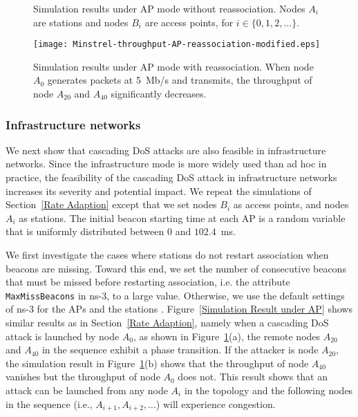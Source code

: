 \documentclass{IEEEtran}
\begin{document}
\begin{figure}[!t]
\centering
{}
\vfil
{}
\caption{Simulation results under AP mode without reassociation. Nodes $A_i$ are stations and
  nodes $B_i$ are access points, for $i \in \{0,1,2,\dots\}$.}
\label{Simulation Result under AP}
\end{figure}

\begin{figure}[!t]
\centering
\texttt{[image: Minstrel-throughput-AP-reassociation-modified.eps]}
\caption{Simulation results under AP mode with reassociation. When
  node $A_{0}$ generates packets at 5~Mb/s and transmits, the throughput of node $A_{20}$ and $A_{40}$ significantly decreases.}
\label{Simulation Result under AP mode with reassociation}
\end{figure}


\subsubsection{Infrastructure networks}
We next show that cascading DoS attacks are also feasible in
infrastructure networks. Since the infrastructure mode is more
widely used than ad hoc in practice, the feasibility of the cascading
DoS attack in infrastructure networks increases its severity and
potential impact. We repeat the simulations of Section~\ref{Rate
  Adaption} except that we set nodes $B_i$ as access points, and
nodes $A_i$ as stations. The initial beacon starting time at each AP is a random variable that is uniformly distributed between 0 and $102.4$~ms.

We first investigate the cases where stations do not restart association when beacons are missing.
Toward this end, we set the number of consecutive beacons that must be missed before restarting association, i.e. the attribute {\tt MaxMissBeacons} in ns-3, to a large value.
Otherwise, we use the default settings of ns-3 for the APs \cite{ns3ap} and the stations \cite{ns3sta}. Figure~\ref{Simulation Result under
AP} shows similar results as
in Section~\ref{Rate Adaption}, namely when a cascading DoS attack is launched by node $A_0$, as shown in Figure~\ref{Simulation Result under AP}(a),
the remote nodes $A_{20}$ and $A_{40}$ in the sequence exhibit a phase transition.
If the attacker is node $A_{20}$, the simulation result in Figure~\ref{Simulation Result under AP}(b) shows that the throughput of node
$A_{40}$ vanishes but the throughput of node $A_0$ does not. This result shows that an attack can be launched from any node $A_i$ in the topology
and the following nodes in the sequence (i.e., $A_{i+1}, A_{i+2}, \ldots$) will experience congestion.
\end{document}
